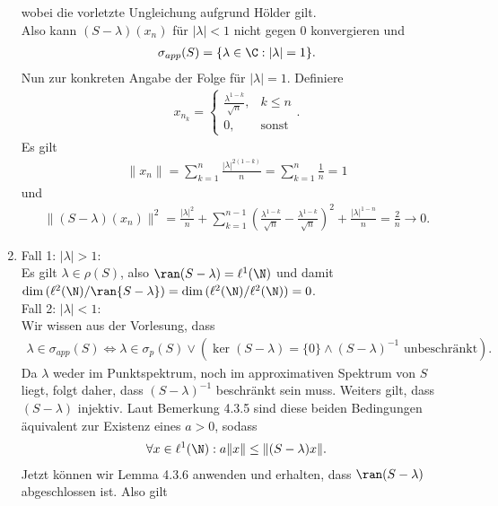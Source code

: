 \begin{solution}
\begin{enumerate}[label = (\alph*)]
  wobei die vorletzte Ungleichung aufgrund Hölder gilt. \\
  Also kann $(S - \lambda)(x_n)$ für $|\lambda| < 1$ nicht gegen $0$ konvergieren und
  \begin{align*}
    \sigma_{app}(S) = \{\lambda \in \C: |\lambda| = 1 \}.
  \end{align*}
  Nun zur konkreten Angabe der Folge für $|\lambda| = 1$. Definiere
  \begin{align*}
    x_{n_k} = \begin{cases}
      \frac{\lambda^{1-k}}{\sqrt{n}}, & k \leq n \\
      0, & \text{sonst}
    \end{cases}.
  \end{align*}
  Es gilt
  \begin{align*}
    \|x_n\| = \sum_{k=1}^n\frac{|\lambda|^{2(1-k)}}{n} = \sum_{k=1}^n\frac{1}{n} = 1
  \end{align*}
  und
  \begin{align*}
    \|(S - \lambda)(x_n)\|^2 = \frac{|\lambda|^2}{n} + \sum_{k = 1}^{n-1} \left(\frac{\lambda^{1-k}}{\sqrt{n}}-
    \frac{\lambda^{1-k}}{\sqrt{n}}\right)^2 +\frac{|\lambda|^{1-n}}{n} = \frac{2}{n} \to 0.
  \end{align*}
  \item Fall 1: $|\lambda| > 1$: \\
  Es gilt $\lambda \in \rho(S)$, also $\ran(S - \lambda) = \ell^1(\N)$ und damit
  $\dim{(\ell^2(\N) / \ran{S - \lambda})} = \dim{(\ell^2(\N) / \ell^2(\N))} = 0$. \\
  Fall 2: $|\lambda| < 1$: \\
  Wir wissen aus der Vorlesung, dass
  \begin{align*}
    \lambda \in \sigma_{app}(S) \iff \lambda \in \sigma_p(S) \lor (\ker(S - \lambda) = \{0\} \land (S - \lambda)^{-1} \text{ unbeschränkt}).
  \end{align*}
  Da $\lambda$ weder im Punktspektrum, noch im approximativen Spektrum von $S$ liegt,
  folgt daher, dass $(S - \lambda)^{-1}$ beschränkt sein muss. Weiters gilt, dass $(S - \lambda)$
  injektiv. Laut Bemerkung 4.3.5 sind diese beiden Bedingungen äquivalent zur Existenz eines $a > 0$, sodass
  \begin{align*}
    \forall x \in \ell^1(\N): a\|x\| \leq \|(S - \lambda)x\|.
  \end{align*}
  Jetzt können wir Lemma 4.3.6 anwenden und erhalten, dass $\ran(S - \lambda)$ abgeschlossen ist. Also gilt
  \begin{align*}

\end{align*}
\end{enumerate}
\end{solution}
